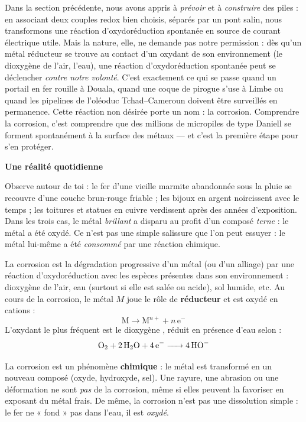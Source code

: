 \documentclass[11pt]{article}
\newcommand{\cle}[1]{{\popxbold\color{popdark}#1}}
\newcounter{popsec}
\newcounter{popsub}
\newcommand{\courssub}[1]{%
  \stepcounter{popsub}%
  \par\vspace{9pt}\noindent{\popxbold\fontsize{11.5}{13}\selectfont\color{popink}{\color{poporange}\thepopsec.\thepopsub}\hspace{6pt}#1}\par\nopagebreak\vspace{4pt}
}
\begin{document}
Dans la section précédente, nous avons appris à \emph{prévoir} et à \emph{construire} des piles : en associant deux couples redox bien choisis, séparés par un pont salin, nous transformons une réaction d'oxydoréduction spontanée en source de courant électrique utile. Mais la nature, elle, ne demande pas notre permission : dès qu'un métal réducteur se trouve au contact d'un oxydant de son environnement (le dioxygène de l'air, l'eau), une réaction d'oxydoréduction spontanée peut se déclencher \emph{contre notre volonté}. C'est exactement ce qui se passe quand un portail en fer rouille à Douala, quand une coque de pirogue s'use à Limbe ou quand les pipelines de l'oléoduc Tchad--Cameroun doivent être surveillés en permanence. Cette réaction non désirée porte un nom : la \cle{corrosion}. Comprendre la corrosion, c'est comprendre que des millions de micropiles de type Daniell se forment spontanément à la surface des métaux — et c'est la première étape pour s'en protéger.

\courssub{Définition et manifestations de la corrosion}

\textbf{Une réalité quotidienne}\par
Observe autour de toi : le fer d'une vieille marmite abandonnée sous la pluie se recouvre d'une couche brun-rouge friable ; les bijoux en argent noircissent avec le temps ; les toitures et statues en cuivre verdissent après des années d'exposition. Dans les trois cas, le métal \emph{brillant} a disparu au profit d'un composé \emph{terne} : le métal a été oxydé. Ce n'est pas une simple salissure que l'on peut essuyer : le métal lui-même a été \emph{consommé} par une réaction chimique.

\begin{definition}[Corrosion]
La \cle{corrosion} est la dégradation progressive d'un métal (ou d'un alliage) par une réaction d'\cle{oxydoréduction} avec les espèces présentes dans son environnement : dioxygène de l'air, eau (surtout si elle est salée ou acide), sol humide, etc. Au cours de la corrosion, le métal $M$ joue le rôle de \textbf{réducteur} et est oxydé en cations :
\[ \mathrm{M} \rightarrow \mathrm{M}^{n+} + n\,\mathrm{e}^- \]
L'oxydant le plus fréquent est le dioxygène , réduit en présence d'eau selon :
\[ \ce{O2 + 2 H2O + 4 e- -> 4 HO-} \]
\end{definition}

\begin{attention}
La corrosion est un phénomène \textbf{chimique} : le métal est transformé en un nouveau composé (oxyde, hydroxyde, sel). Une rayure, une abrasion ou une déformation ne sont \emph{pas} de la corrosion, même si elles peuvent la favoriser en exposant du métal frais. De même, la corrosion n'est pas une dissolution simple : le fer ne « fond » pas dans l'eau, il est \emph{oxydé}.
\end{attention}
\end{document}
